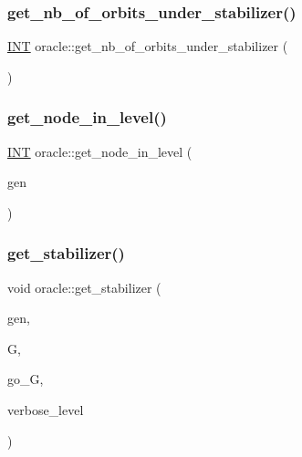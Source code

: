 \subsubsection{\texorpdfstring{get\+\_\+nb\+\_\+of\+\_\+orbits\+\_\+under\+\_\+stabilizer()}{get\_nb\_of\_orbits\_under\_stabilizer()}}
{\footnotesize\ttfamily \mbox{\hyperlink{galois_8h_a09fddde158a3a20bd2dcadb609de11dc}{I\+NT}} oracle\+::get\+\_\+nb\+\_\+of\+\_\+orbits\+\_\+under\+\_\+stabilizer (\begin{DoxyParamCaption}{ }\end{DoxyParamCaption})}

\mbox{\label{classoracle_a4ac71e4eb496ebd67bb6c2475153a6b4}} 
\subsubsection{\texorpdfstring{get\+\_\+node\+\_\+in\+\_\+level()}{get\_node\_in\_level()}}
{\footnotesize\ttfamily \mbox{\hyperlink{galois_8h_a09fddde158a3a20bd2dcadb609de11dc}{I\+NT}} oracle\+::get\+\_\+node\+\_\+in\+\_\+level (\begin{DoxyParamCaption}\item[{\mbox{\hyperlink{classgenerator}{generator}} $\ast$}]{gen }\end{DoxyParamCaption})}

\mbox{\label{classoracle_a66344906577c7688e2e5f3d0c5748d2c}} 
\subsubsection{\texorpdfstring{get\+\_\+stabilizer()}{get\_stabilizer()}}
{\footnotesize\ttfamily void oracle\+::get\+\_\+stabilizer (\begin{DoxyParamCaption}\item[{\mbox{\hyperlink{classgenerator}{generator}} $\ast$}]{gen,  }\item[{\mbox{\hyperlink{classgroup}{group}} \&}]{G,  }\item[{\mbox{\hyperlink{classlonginteger__object}{longinteger\+\_\+object}} \&}]{go\+\_\+G,  }\item[{\mbox{\hyperlink{galois_8h_a09fddde158a3a20bd2dcadb609de11dc}{I\+NT}}}]{verbose\+\_\+level }\end{DoxyParamCaption})}

